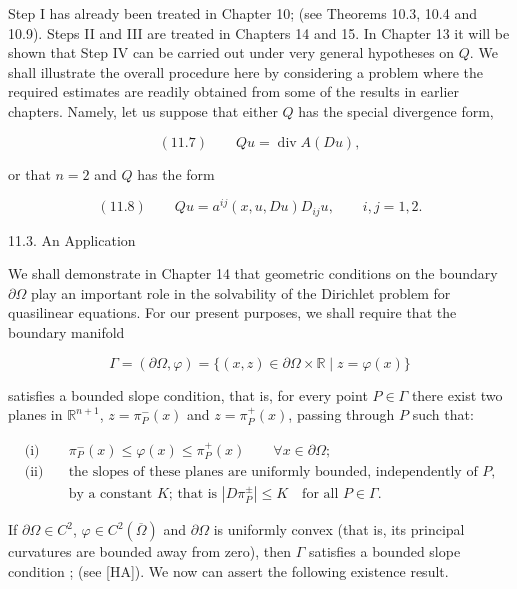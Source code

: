 Step I has already been treated in Chapter 10; (see Theorems 10.3, 10.4 and 10.9). Steps II and III are treated in Chapters 14 and 15. In Chapter 13 it will be shown that Step IV can be carried out under very general hypotheses on $Q$. We shall illustrate the overall procedure here by considering a problem where the required estimates are readily obtained from some of the results in earlier chapters. Namely, let us suppose that either $Q$ has the special divergence form,

\begin{equation}
(11.7)\qquad Qu=\operatorname{div} A(Du),
\end{equation}

\noindent or that $n=2$ and $Q$ has the form

\begin{equation}
(11.8)\qquad Qu=a^{ij}(x,u,Du)D_{ij}u,\qquad i,j=1,2.
\end{equation}


11.3. An Application

We shall demonstrate in Chapter 14 that geometric conditions on the boundary $\partial\Omega$
play an important role in the solvability of the Dirichlet problem for quasilinear
equations. For our present purposes, we shall require that the boundary manifold

\[
\Gamma=(\partial\Omega,\varphi)=\{(x,z)\in \partial\Omega\times\mathbb{R}\mid z=\varphi(x)\}
\]

satisfies a bounded slope condition, that is, for every point $P\in\Gamma$ there exist two
planes in $\mathbb{R}^{n+1}$, $z=\pi_P^-(x)$ and $z=\pi_P^+(x)$, passing through $P$ such that:

\begin{align*}
\text{(i)}\quad &\pi_P^-(x)\le \varphi(x)\le \pi_P^+(x) \qquad \forall x\in \partial\Omega;\\
\text{(ii)}\quad &\text{the slopes of these planes are uniformly bounded, independently of $P$,}\\
&\text{by a constant $K$; that is }|D\pi_P^\pm|\le K \quad \text{for all }P\in\Gamma.
\end{align*}

If $\partial\Omega\in C^2$, $\varphi\in C^2(\overline{\Omega})$ and $\partial\Omega$ is uniformly convex (that is, its principal curvatures
are bounded away from zero), then $\Gamma$ satisfies a bounded slope condition ; (see
[HA]). We now can assert the following existence result.

